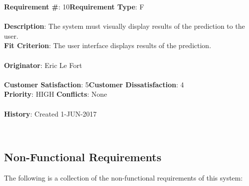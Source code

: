\documentclass[titlepage]{article}
\begin{document}
\begin{framed}
	\noindent\textbf{Requirement \#}: 10\hfill \textbf{Requirement Type}: F\hfill\\\\
	\noindent\textbf{Description}: The system must visually display results of the prediction to the user.\\
	\textbf{Fit Criterion}: The user interface displays results of the prediction.\\\\
	\textbf{Originator}: Eric Le Fort\\\\
	\noindent\textbf{Customer Satisfaction}: 5\hfill \textbf{Customer Dissatisfaction}: 4\hfill\\
	\textbf{Priority}: HIGH \hfill \textbf{Conflicts}: None\hfill\\\\
	\noindent\textbf{History}: Created 1-JUN-2017
\end{framed}~\\[6mm]


\subsection{Non-Functional Requirements}
The following is a collection of the non-functional requirements of this system:
\end{document}
